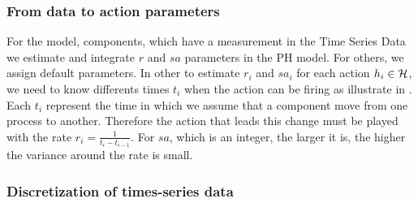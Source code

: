 \subsubsection{From data to action parameters}

For the model, components, which have a measurement in the Time Series Data we estimate and integrate $r$ and $sa$ parameters in the PH model. For others, we assign default 
parameters. In other to estimate $r_{i}$ and $sa_{i}$ for each action $h_{i} \in \mathcal{H}$, we need to know differents times $t_{i}$  when the action can be firing as illustrate 
in . Each  $t_{i}$ represent the time in which we assume that a component move from one process to another. Therefore the action that leads this 
change must be played with the rate $r_{i}=\frac{1}{t_{i}-t_{i-1}}$. For $sa$, which is an integer, the larger it is, the higher the variance around the rate is small.


\subsubsection{Discretization of times-series data}


